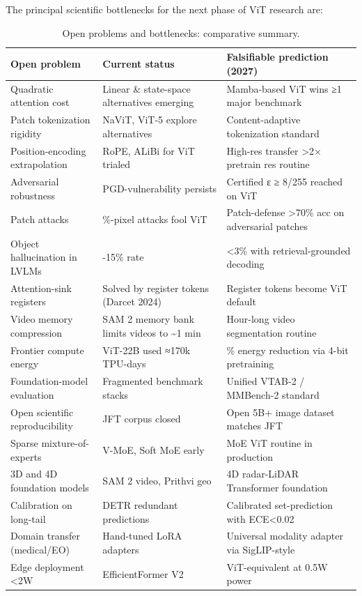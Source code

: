 \documentclass{article}
\begin{document}
The principal scientific bottlenecks for the next phase of ViT research are:

\begin{table}[t]
\centering
\caption{Open problems and bottlenecks: comparative summary.}
\label{tab:open-problems-and-bottlenecks}
\begin{tabular}{>{\raggedright\arraybackslash}p{0.2627\linewidth}
  >{\raggedright\arraybackslash}p{0.3559\linewidth}
  >{\raggedright\arraybackslash}p{0.3814\linewidth}}
\toprule
Open problem & Current status & Falsifiable prediction (2027) \\
\midrule
Quadratic attention cost & Linear \& state-space alternatives emerging & Mamba-based ViT wins ≥1 major benchmark \\
Patch tokenization rigidity & NaViT, ViT-5 explore alternatives & Content-adaptive tokenization standard \\
Position-encoding extrapolation & RoPE, ALiBi for ViT trialed & High-res transfer \textgreater2× pretrain res routine \\
Adversarial robustness & PGD-vulnerability persists & Certified ε ≥ 8/255 reached on ViT \\
Patch attacks & 4\%-pixel attacks fool ViT & Patch-defense \textgreater70\% acc on adversarial patches \\
Object hallucination in LVLMs & 5-15\% rate & \textless3\% with retrieval-grounded decoding \\
Attention-sink registers & Solved by register tokens (Darcet 2024) & Register tokens become ViT default \\
Video memory compression & SAM 2 memory bank limits videos to \textasciitilde1 min & Hour-long video segmentation routine \\
Frontier compute energy & ViT-22B used ≈170k TPU-days & 50\% energy reduction via 4-bit pretraining \\
Foundation-model evaluation & Fragmented benchmark stacks & Unified VTAB-2 / MMBench-2 standard \\
Open scientific reproducibility & JFT corpus closed & Open 5B+ image dataset matches JFT \\
Sparse mixture-of-experts & V-MoE, Soft MoE early & MoE ViT routine in production \\
3D and 4D foundation models & SAM 2 video, Prithvi geo & 4D radar-LiDAR Transformer foundation \\
Calibration on long-tail & DETR redundant predictions & Calibrated set-prediction with ECE\textless0.02 \\
Domain transfer (medical/EO) & Hand-tuned LoRA adapters & Universal modality adapter via SigLIP-style \\
Edge deployment \textless2W & EfficientFormer V2 & ViT-equivalent at 0.5W power \\
\end{tabular}
\end{table}
\end{document}
